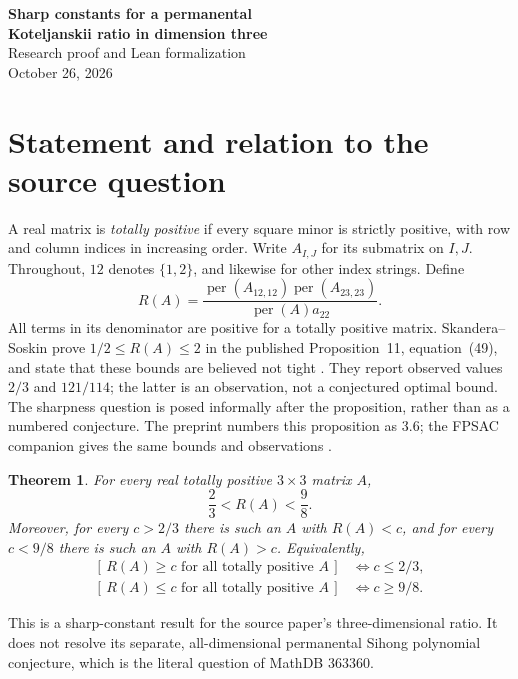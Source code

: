 \documentclass[11pt]{article}
\newtheorem{theorem}{Theorem}
\newcommand{\per}{\operatorname{per}}
\begin{document}
\begin{center}
{\Large\bfseries Sharp constants for a permanental\\Koteljanskii ratio in dimension three}\\[.5em]
Research proof and Lean formalization\\
October 26, 2026
\end{center}
\begin{abstract}
For every real totally positive $3\times3$ matrix $A$, we prove
\[
 \frac23<\frac{\per(A_{12,12})\per(A_{23,23})}{\per(A)a_{22}}<\frac98.
\]
Both constants are optimal within the strictly totally positive class and
are not attained there. Positive row and column scaling reduces the proof
to two explicit polynomial positivity certificates in four variables.
Strictly totally positive one-parameter families approach both bounds.
The result sharpens the bounds $1/2$ and $2$ in Skandera--Soskin,
Proposition~11. Known failures of a permanental Koteljanskii inequality
and previously displayed endpoint examples are not claimed as new.
\end{abstract}

\section{Statement and relation to the source question}
A real matrix is \emph{totally positive} if every square minor is strictly
positive, with row and column indices in increasing order. Write
$A_{I,J}$ for its submatrix on $I,J$. Throughout, $12$ denotes $\{1,2\}$,
and likewise for other index strings. Define
\[
 R(A)=\frac{\per(A_{12,12})\per(A_{23,23})}{\per(A)a_{22}}.
\]
All terms in its denominator are positive for a totally positive matrix.
Skandera--Soskin prove $1/2\le R(A)\le2$ in the published
Proposition~11, equation~(49), and state that these bounds are believed
not tight \cite[p.~13]{SS25}. They report observed values $2/3$ and
$121/114$; the latter is an observation, not a conjectured optimal bound.
The sharpness question is posed informally after the proposition, rather than
as a numbered conjecture. The preprint numbers this proposition as 3.6; the FPSAC companion gives
the same bounds and observations \cite{SSfpsac}.
\begin{theorem}\label{main}
For every real totally positive $3\times3$ matrix $A$,
\[
                         \frac23<R(A)<\frac98.
\]
Moreover, for every $c>2/3$ there is such an $A$ with $R(A)<c$, and for
every $c<9/8$ there is such an $A$ with $R(A)>c$. Equivalently,
\[
\begin{split}
 [\,R(A)\ge c\text{ for all totally positive }A\,]&\iff c\le2/3,\\
 [\,R(A)\le c\text{ for all totally positive }A\,]&\iff c\ge9/8.
\end{split}
\]
\end{theorem}
This is a sharp-constant result for the source paper's three-dimensional
ratio. It does not resolve its separate, all-dimensional permanental
Sihong polynomial conjecture, which is the literal question of MathDB
363360.
\end{document}
